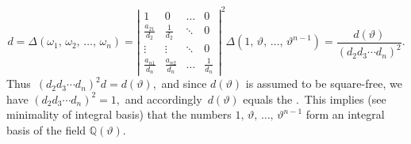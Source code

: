 \documentclass[12pt]{article}
\theoremstyle{definition}
\begin{document}
\begin{equation*}
d = \Delta(\omega_1,\,\omega_2,\,\ldots,\,\omega_n) = \left|
\begin{array}{cccc}
1 & 0 &\ldots & 0 \\
\frac{a_{21}}{d_2} & \frac{1}{d_2} & \ddots & 0\\
\vdots & \vdots & \ddots & 0 \\
\frac{a_{n1}}{d_n} & \frac{a_{n2}}{d_n}& \ldots & \frac{1}{d_n}
\end{array}\right|^2 \Delta(1,\,\vartheta,\,\ldots,\,\vartheta^{n-1})
= \frac{d(\vartheta)}{(d_2d_3\cdots d_n)^2}.
\end{equation*}
Thus\, $(d_2d_3\cdots d_n)^2d = d(\vartheta)$,\, and since $d(\vartheta)$ is assumed to be square-free, we have 
$(d_2d_3\cdots d_n)^2 = 1$,\, and accordingly\, $d(\vartheta)$ equals the .\, This implies (see minimality of integral basis) that the numbers $1,\,\vartheta,\,\ldots,\,\vartheta^{n-1}$ form an integral basis of the field $\mathbb{Q}(\vartheta)$.
\end{document}

